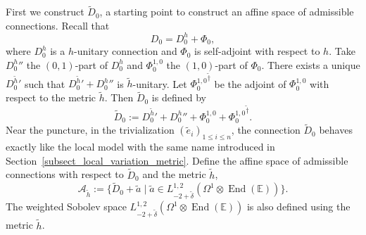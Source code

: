\documentclass[JEP,XML,SOM,NoEqCountersInSection,Unicode,published]{cedram}
\theoremstyle{definition}
\theoremstyle{plain}
\DeclareMathOperator{\End}{End}
\begin{document}
First we construct $\widetilde{D}_0$, a starting point to construct an affine space of admissible connections. Recall that
\[
D_0 = D_0^h +\Phi_0,
\]
where $D_0^h$ is a $h$-unitary connection and $\Phi_0$ is self-adjoint with respect to $h$. Take ${D^h_0}{}''$ the $(0,1)$-part of $D_0^h$ and $\Phi_0^{1,0}$ the $(1,0)$-part of $\Phi_0$. There exists a unique ${D^{\widetilde{h}}_0}{}'$ such that ${D^{\widetilde{h}}_0}{}'+{D^h_0}{}''$ is $\widetilde{h}$-unitary. Let ${\Phi_0^{1,0}}^{\widetilde{\dagger}}$ be the adjoint of $\Phi_0^{1,0}$ with respect to the metric $\widetilde{h}$. Then $\widetilde{D}_0$ is defined by
\[
\widetilde{D}_0 := {D^{\widetilde{h}}_0}{}'+{D^h_0}{}''+ \Phi_0^{1,0} + {\Phi_0^{1,0}}^{\widetilde{\dagger}}.
\]
Near the puncture, in the trivialization $(\widetilde{e}_i)_{1\le i \le n}$, the connection $\widetilde{D}_0$ behaves exactly like the local model with the same name introduced in Section~\ref{subsect_local_variation_metric}. Define the affine space of admissible connections with respect to $\widetilde{D}_0$ and the metric $\widetilde{h}$,
\[
\mathcal{A}_{\widetilde{h}}:=\lbrace \widetilde{D}_0 + \widetilde{a} \mid \widetilde{a} \in L^{1,2}_{-2+\widetilde{\delta}}(\Omega^1 \otimes \End(\mathbb{E}))\rbrace.
\]
The weighted Sobolev space $L^{1,2}_{-2+\widetilde{\delta}}(\Omega^1\otimes \End(\mathbb{E}))$ is also defined using the metric $\widetilde{h}$.
\end{document}
